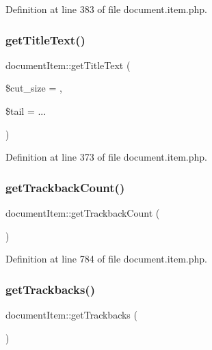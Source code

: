 Definition at line 383 of file document.\+item.\+php.

\hypertarget{classdocumentItem_aad953dc30cf01a1d451cb90c66c09b0c}{}\label{classdocumentItem_aad953dc30cf01a1d451cb90c66c09b0c} 
\subsubsection{\texorpdfstring{get\+Title\+Text()}{getTitleText()}}
{\footnotesize\ttfamily document\+Item\+::get\+Title\+Text (\begin{DoxyParamCaption}\item[{}]{\$cut\+\_\+size = {},  }\item[{}]{\$tail = {\ttfamily \textquotesingle{}...\textquotesingle{}} }\end{DoxyParamCaption})}



Definition at line 373 of file document.\+item.\+php.

\hypertarget{classdocumentItem_af1520e91e8dd49202cfb93909db61c48}{}\label{classdocumentItem_af1520e91e8dd49202cfb93909db61c48} 
\subsubsection{\texorpdfstring{get\+Trackback\+Count()}{getTrackbackCount()}}
{\footnotesize\ttfamily document\+Item\+::get\+Trackback\+Count (\begin{DoxyParamCaption}{ }\end{DoxyParamCaption})}



Definition at line 784 of file document.\+item.\+php.

\hypertarget{classdocumentItem_a0c69601e59c290048081bf8d8aa7602e}{}\label{classdocumentItem_a0c69601e59c290048081bf8d8aa7602e} 
\subsubsection{\texorpdfstring{get\+Trackbacks()}{getTrackbacks()}}
{\footnotesize\ttfamily document\+Item\+::get\+Trackbacks (\begin{DoxyParamCaption}{ }\end{DoxyParamCaption})}



